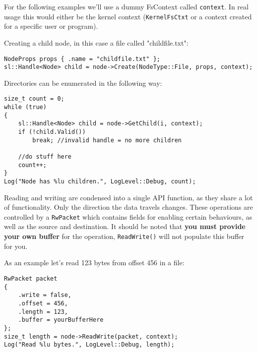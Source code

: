 For the following examples we'll use a dummy FsContext called \verb|context|. In real usage this would either be the kernel context (\verb|KernelFsCtxt| or a context created for a specific user or program).

Creating a child node, in this case a file called "childfile.txt":
\begin{lstlisting}
NodeProps props { .name = "childfile.txt" };
sl::Handle<Node> child = node->Create(NodeType::File, props, context);
\end{lstlisting}

Directories can be enumerated in the following way:
\begin{lstlisting}
size_t count = 0;
while (true)
{
    sl::Handle<Node> child = node->GetChild(i, context);
    if (!child.Valid())
        break; //invalid handle = no more children

    //do stuff here
    count++;
}
Log("Node has %lu children.", LogLevel::Debug, count);
\end{lstlisting}

Reading and writing are condensed into a single API function, as they share a lot of functionality. Only the direction the data travels changes. These operations are controlled by a \verb|RwPacket| which contains fields for enabling certain behaviours, as well as the source and destination. It should be noted that \textbf{you must provide your own buffer} for the operation, \verb|ReadWrite()| will not populate this buffer for you.

As an example let's read 123 bytes from offset 456 in a file:
\begin{lstlisting}
RwPacket packet 
{
    .write = false,
    .offset = 456,
    .length = 123,
    .buffer = yourBufferHere
};
size_t length = node->ReadWrite(packet, context);
Log("Read %lu bytes.", LogLevel::Debug, length);
\end{lstlisting}
